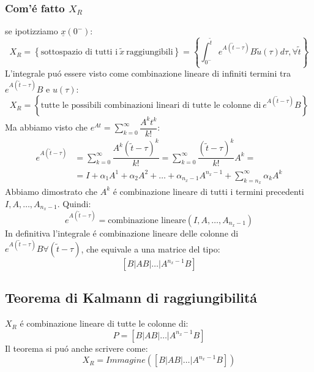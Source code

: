 \documentclass[../main.tex]{subfiles}
\begin{document}
	\subsubsection{Com'\'e fatto $ X_R $}
		se ipotizziamo $ \underline x(0^-) $:
		\[ X_R = \left\lbrace \text{sottospazio di tutti i}\ \tilde x\ \text{raggiungibili} \right\rbrace = \left\lbrace \int_{0^-}^{\tilde t} e^{A(\tilde t - \tau)} B \tilde u(\tau) d\tau, \forall \tilde t \right\rbrace \]
		L'integrale pu\'o essere visto come combinazione lineare di infiniti termini tra $ e^{A(\tilde t - \tau)} B $ e $ u(\tau) $:
		\[ X_R = \left\lbrace \text{tutte le possibili combinazioni lineari di tutte le colonne di}\ e^{A(\tilde t - \tau)} B \right\rbrace \]
		Ma abbiamo visto che $ e^{At} = \sum_{k=0}^{\infty} \dfrac{A^k t^k}{k!} $:
		\begin{align*}
			e^{A(\tilde t - \tau)} &= \sum_{k=0}^{\infty} \dfrac{A^k (\tilde t - \tau)^k}{k!} = \sum_{k=0}^{\infty} \dfrac{(\tilde t - \tau)^k}{k!} A^k =\\
			&= I + \alpha_1 A^1 + \alpha_2 A^2 + \dots + \alpha_{n_x-1} A^{n_x-1} + \sum_{k=n_x}^{\infty} \alpha_k A^k
		\end{align*}		
		Abbiamo dimostrato che $ A^k $ \'e combinazione lineare di tutti i termini precedenti $ I, A, \dots, A_{n_x-1} $. Quindi:
		\[ e^{A(\tilde t - \tau)} = \text{combinazione lineare}(I, A, \dots, A_{n_x-1}) \]
		In definitiva l'integrale \'e combinazione lineare delle colonne di $ e^{A(\tilde t - \tau)} B \forall (\tilde t - \tau) $, che equivale a una matrice del tipo:
		\[ \left[ B | AB | \dots | A^{n_x-1} B \right] \]

	\subsection{Teorema di Kalmann di raggiungibilit\'a}
		$ X_R $ \'e combinazione lineare di tutte le colonne di:
		\[ P = \left[ B | AB | \dots | A^{n_x-1} B \right] \]
		Il teorema si pu\'o anche scrivere come:
		\[ X_R = Immagine\left( \left[ B | AB | \dots | A^{n_x-1} B \right] \right) \]
		
\end{document}
